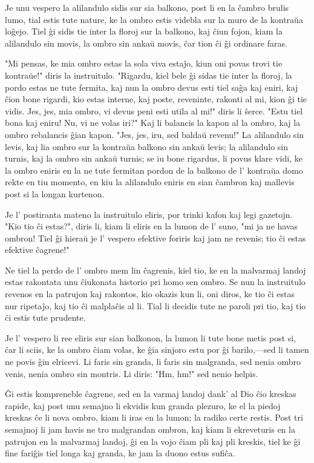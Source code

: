 Je unu vespero la alilandulo sidis sur sia balkono, post li en la ĉambro brulis lumo, tial estis tute nature, ke la ombro estis videbla sur la muro de la kontraŭa loĝejo. Tiel ĝi sidis tie inter la floroj sur la balkono, kaj ĉiun fojon, kiam la alilandulo sin movis, la ombro sin ankaŭ movis, ĉar tion ĉi ĝi ordinare faras.

"Mi pensas, ke mia ombro estas la sola viva estaĵo, kiun oni povas trovi tie kontraŭe!" diris la instruitulo. "Rigardu, kiel bele ĝi sidas tie inter la floroj, la pordo estas ne tute fermita, kaj nun la ombro devus esti tiel saĝa kaj eniri, kaj ĉion bone rigardi, kio estas interne, kaj poste, reveninte, rakonti al mi, kion ĝi tie vidis. Jes, jes, mia ombro, vi devus peni esti utila al mi!" diris li ŝerce. "Estu tiel bona kaj eniru! Nu, vi ne volas iri?" Kaj li balancis la kapon al la ombro, kaj la ombro rebalancis ĝian kapon. "Jes, jes, iru, sed baldaŭ revenu!" La alilandulo sin levis, kaj lia ombro sur la kontraŭa balkono sin ankaŭ levis; la alilandulo sin turnis, kaj la ombro sin ankaŭ turnis; se iu bone rigardus, li povus klare vidi, ke la ombro eniris en la ne tute fermitan pordon de la balkono de l' kontraŭa domo rekte en tiu momento, en kiu la alilandulo eniris en sian ĉambron kaj mallevis post si la longan kurtenon.

Je l' postiranta mateno la instruitulo eliris, por trinki kafon kaj legi gazetojn. "Kio tio ĉi estas?", diris li, kiam li eliris en la lumon de l' suno, "mi ja ne havas ombron! Tiel ĝi hieraŭ je l' vespero efektive foriris kaj jam ne revenis; tio ĉi estas efektive ĉagrene!"

Ne tiel la perdo de l' ombro mem lin ĉagrenis, kiel tio, ke en la malvarmaj landoj estas rakontata unu ĉiukonata historio pri homo sen ombro. Se nun la instruitulo revenos en la patrujon kaj rakontos, kio okazis kun li, oni diros, ke tio ĉi estas nur ripetaĵo, kaj tio ĉi malplaĉis al li. Tial li decidis tute ne paroli pri tio, kaj tio ĉi estis tute prudente.

Je l' vespero li ree eliris sur sian balkonon, la lumon li tute bone metis post si, ĉar li sciis, ke la ombro ĉiam volas, ke ĝia sinjoro estu por ĝi barilo,---sed li tamen ne povis ĝin elricevi. Li faris sin granda, li faris sin malgranda, sed nenia ombro venis, nenia ombro sin montris. Li diris: "Hm, hm!" sed nenio helpis.

Ĝi estis kompreneble ĉagrene, sed en la varmaj landoj dank' al Dio ĉio kreskas rapide, kaj post unu semajno li ekvidis kun granda plezuro, ke el la piedoj kreskas ĉe li nova ombro, kiam li iras en la lumon; la radiko certe restis. Post tri semajnoj li jam havis ne tro malgrandan ombron, kaj kiam li ekreveturis en la patrujon en la malvarmaj landoj, ĝi en la vojo ĉiam pli kaj pli kreskis, tiel ke ĝi fine fariĝis tiel longa kaj granda, ke jam la duono estus sufiĉa.

